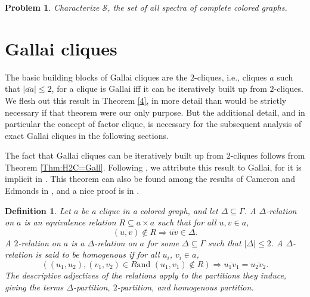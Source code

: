 \documentclass[12pt]{amsart}
\theoremstyle{plain}
\newtheorem{definition}[theorem]{Definition}
\newtheorem{problem}[theorem]{Problem}
\numberwithin{equation}{section}
\begin{document}
\begin{problem} Characterize $\mathcal{S}$, the set of all spectra of complete
colored graphs.
\end{problem}


\section{Gallai cliques\label{Sec:GallCliq}}

The basic building blocks of Gallai cliques are the $2$-cliques, i.e., cliques
$a$ such that $\left\vert \overline{aa}\right\vert \leq2$, for a clique is
Gallai iff it can be iteratively built up from $2$-cliques. We flesh out this
result in Theorem \ref{4}, in more detail than would be strictly necessary if
that theorem were our only purpose. But the additional detail, and in
particular the concept of factor clique, is necessary for the subsequent
analysis of exact Gallai cliques in the following sections.

The fact that Gallai cliques can be iteratively built up from $2$-cliques
follows from Theorem \ref{Thm:H2C=Gall}. Following \cite{GyarfasSimonyi:2004},
we attribute this result to Gallai, for it is implicit in \cite{Gallai:1967}.
This theorem can also be found among the results of Cameron and Edmonds in
\cite{CameronEdmonds:1997}, and a nice proof is in \cite{GyarfasSimonyi:2004}.

\begin{definition}
Let $a$ be a clique in a colored graph, and let $\Delta\subseteq\Gamma$. A
$\Delta$\emph{-relation on }$a$ is an equivalence relation $R\subseteq a\times
a$ such that for all $u,v\in a$,
\begin{displaymath}
    \left(  u,v\right)  \notin R\Longrightarrow\overline{uv}\in\Delta.
\end{displaymath}
A $2$\emph{-relation on }$a$ is a $\Delta$-relation on $a$ for some
$\Delta\subseteq\Gamma$ such that $\left\vert \Delta\right\vert \leq2$. A
$\Delta$-relation is said to be \emph{homogenous} if for all $u_{i}$,
$v_{i}\in a$,
\begin{displaymath}
    \left(  \left(  u_{1},u_{2}\right)  ,\left(  v_{1},v_{2}\right)  \in R\text{
    and }\left(  u_{1},v_{1}\right)  \notin R\right)  \Longrightarrow
    \overline{u_{1}v_{1}}=\overline{u_{2}v_{2}}.
\end{displaymath}
The descriptive adjectives of the relations apply to the partitions they
induce, giving the terms $\Delta$\emph{-partition}, $2$\emph{-partition}, and
\emph{homogenous partition}.
\end{definition}
\end{document}
